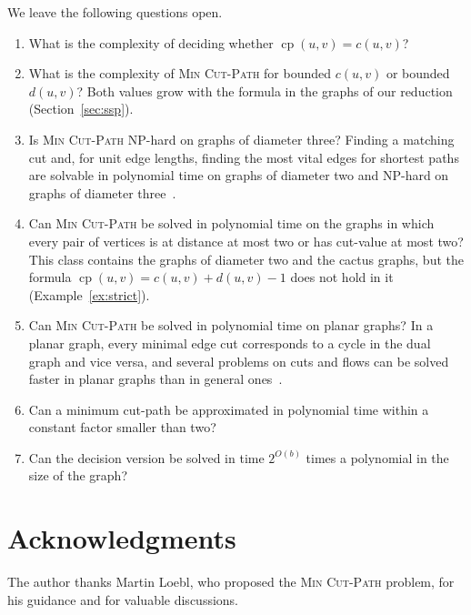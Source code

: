 \documentclass[a4paper,fleqn]{cas-sc}
\numberwithin{equation}{section}
\theoremstyle{definition}
\theoremstyle{plain}
\theoremstyle{remark}
\newcommand{\cp}{\operatorname{cp}}                  %
\newcommand{\MinCutPath}{\textsc{Min Cut-Path}}
\begin{document}
We leave the following questions open.
\begin{enumerate}
    \item What is the complexity of deciding whether $\cp(u, v) = c(u, v)$?

    \item What is the complexity of \MinCutPath{} for bounded $c(u, v)$ or bounded $d(u, v)$?
    Both values grow with the formula in the graphs of our reduction (Section~\ref{sec:ssp}).

    \item Is \MinCutPath{} NP-hard on graphs of diameter three?
    Finding a matching cut and, for unit edge lengths, finding the most vital edges for shortest paths are solvable in polynomial time on graphs of diameter two and NP-hard on graphs of diameter three~\cite{Bazgan2019MostVital,LeLe2019MatchingCut}.

    \item Can \MinCutPath{} be solved in polynomial time on the graphs in which every pair of vertices is at distance at most two or has cut-value at most two?
    This class contains the graphs of diameter two and the cactus graphs, but the formula $\cp(u, v) = c(u, v) + d(u, v) - 1$ does not hold in it (Example~\ref{ex:strict}).

    \item Can \MinCutPath{} be solved in polynomial time on planar graphs?
    In a planar graph, every minimal edge cut corresponds to a cycle in the dual graph and vice versa, and several problems on cuts and flows can be solved faster in planar graphs than in general ones~\cite{itai1979maximum,henzinger1997faster}.

    \item Can a minimum cut-path be approximated in polynomial time within a constant factor smaller than two?

    \item Can the decision version be solved in time $2^{O(b)}$ times a polynomial in the size of the graph?
\end{enumerate}


\section*{Acknowledgments}

The author thanks Martin Loebl, who proposed the \MinCutPath{} problem, for his guidance and for valuable discussions.




\end{document}

